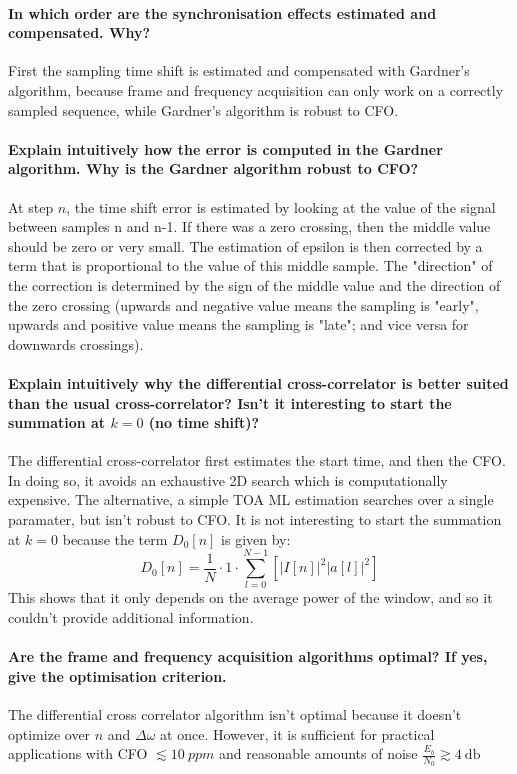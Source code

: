 \paragraph{In which order are the synchronisation effects estimated and compensated. Why?} First the sampling time shift is estimated and compensated with Gardner's algorithm, because frame and frequency acquisition can only work on a correctly sampled sequence, while Gardner's algorithm is robust to CFO.


\paragraph{Explain intuitively how the error is computed in the Gardner algorithm. Why is the
Gardner algorithm robust to CFO?} At step $n$, the time shift error is estimated by looking at the value of the signal between samples n and n-1. If there was a zero crossing, then the middle value should be zero or very small. The estimation of epsilon is then corrected by a term that is proportional to the value of this middle sample. The "direction" of the correction is determined by the sign of the middle value and the direction of the zero crossing (upwards and negative value means the sampling is "early", upwards and positive value means the sampling is "late"; and vice versa for downwards crossings).

\paragraph{Explain intuitively why the differential cross-correlator is better suited than the usual cross-correlator? Isn’t it interesting to start the summation at $k = 0$ (no time shift)?}
The differential cross-correlator first estimates the start time, and then the CFO. In doing so, it avoids an exhaustive 2D search which is computationally expensive. The alternative, a simple TOA ML estimation searches over a single paramater, but isn't robust to CFO.
It is not interesting to start the summation at $k = 0$ because the term $D_0[n]$ is given by:
\[
D_0[n] = \frac{1}{N}\cdot1\cdot\sum_{l=0}^{N-1} \left [ \big | I[n] \big | ^2 \big | a[l] \big | ^2 \right ]
\]
This shows that it only depends on the average power of the window, and so it couldn't provide additional information.

\paragraph{Are the frame and frequency acquisition algorithms optimal? If yes, give the optimisation criterion.}
The differential cross correlator algorithm isn't optimal because it doesn't optimize over $n$ and $\Delta \omega$ at once. However, it is sufficient for practical applications with CFO $\lesssim \SI{10}{ppm}$ and reasonable amounts of noise $\frac{E_b}{N_0} \gtrsim \SI{4}{\decibel}$
